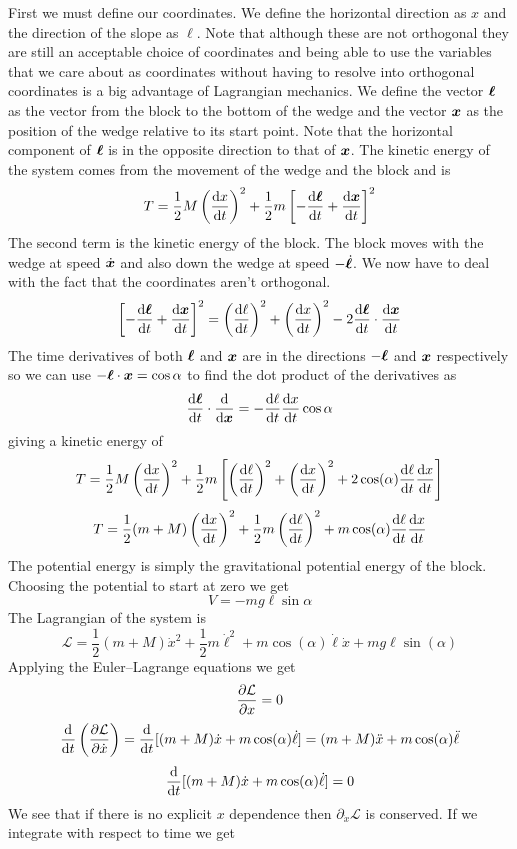 \documentclass{article}
\newcommand{\LL}{\mathcal{L}}
\begin{document}
    First we must define our coordinates.
    We define the horizontal direction as \(x\) and the direction of the slope as \(\ell\).
    Note that although these are not orthogonal they are still an acceptable choice of coordinates and being able to use the variables that we care about as coordinates without having to resolve into orthogonal coordinates is a big advantage of Lagrangian mechanics.
    We define the vector \(\bm{\ell}\) as the vector from the block to the bottom of the wedge and the vector \(\bm{x}\) as the position of the wedge relative to its start point.
    Note that the horizontal component of \(\bm{\ell}\) is in the opposite direction to that of \(\bm{x}\).
    The kinetic energy of the system comes from the movement of the wedge and the block and is
    \[T = \frac{1}{2}M\left(\dv{x}{t}\right)^2 + \frac{1}{2}m\left[-\dv{\bm{\ell}}{t} + \dv{\bm{x}}{t}\right]^2\]
    The second term is the kinetic energy of the block.
    The block moves with the wedge at speed \(\dot{\bm{x}}\) and also down the wedge at speed \(-\dot{\bm{\ell}}\).
    We now have to deal with the fact that the coordinates aren't orthogonal.
    \[\left[-\dv{\bm{\ell}}{t} + \dv{\bm{x}}{t}\right]^2 = \left(\dv{\ell}{t}\right)^2 + \left(\dv{x}{t}\right)^2 - 2\dv{\bm{\ell}}{t}\cdot\dv{\bm{x}}{t}\]
    The time derivatives of both \(\bm{\ell}\) and \(\bm{x}\) are in the directions \(-\bm{\ell}\) and \(\bm{x}\) respectively so we can use \(-\bm{\ell}\cdot\bm{x} = \cos\alpha\) to find the dot product of the derivatives as
    \[\dv{\bm{\ell}}{t}\cdot\dv{\bm{x}} = -\dv{\ell}{t}\dv{x}{t}\cos\alpha\]
    giving a kinetic energy of
    \[T = \frac{1}{2}M\left(\dv{x}{t}\right)^2 + \frac{1}{2}m\left[\left(\dv{\ell}{t}\right)^2 + \left(\dv{x}{t}\right)^2 + 2\cos(\alpha)\dv{\ell}{t}\dv{x}{t}\right]\]
    \[T = \frac{1}{2}(m + M)\left(\dv{x}{t}\right)^2 + \frac{1}{2}m\left(\dv{\ell}{t}\right)^2 + m\cos(\alpha)\dv{\ell}{t}\dv{x}{t}\]
    The potential energy is simply the gravitational potential energy of the block.
    Choosing the potential to start at zero we get
    \[V = -mg\ell\sin\alpha\]
    The Lagrangian of the system is
    \[\LL = \frac{1}{2}(m + M)\dot x^2 + \frac{1}{2}m\dot\ell^2 + m\cos(\alpha)\dot\ell\dot x + mg\ell\sin(\alpha)\]
    Applying the Euler--Lagrange equations we get
    \[\pdv{\LL}{x} = 0\]
    \[\dv{t}\left(\pdv{\LL}{\dot x}\right) = \dv{t}[(m + M)\dot x + m\cos(\alpha)\dot\ell] = (m + M)\ddot x + m\cos(\alpha)\ddot\ell\]
    \[\dv{t}[(m + M)\dot x + m\cos(\alpha)\dot\ell] = 0\]
    We see that if there is no explicit \(x\) dependence then \(\partial_{\dot x}\LL\) is conserved.
    If we integrate with respect to time we get
\end{document}
